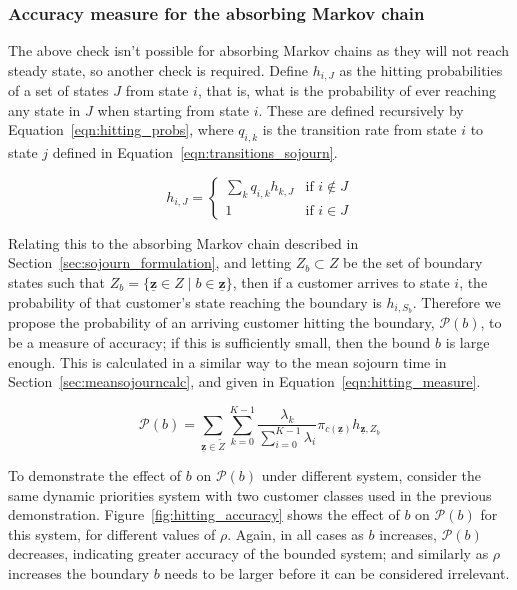 \documentclass{article}
\begin{document}
\subsubsection{Accuracy measure for the absorbing Markov chain}\label{sec:absorbing_accuracy}
The above check isn't possible for absorbing Markov chains as they will not
reach steady state, so another check is required. Define $h_{i,J}$ as
the hitting probabilities of a set of states $J$ from state $i$, that is, what
is the probability of ever reaching any state in $J$ when starting from state
$i$. These are defined recursively by Equation~\ref{eqn:hitting_probs}, where
$q_{i,k}$ is the transition rate from state $i$ to state $j$ defined in
Equation~\ref{eqn:transitions_sojourn}.

\begin{equation}\label{eqn:hitting_probs}
h_{i,J} = \begin{cases}
\sum_k q_{i,k} h_{k,J} & \text{if } i \notin J \\
1 & \text{if } i \in J
\end{cases}
\end{equation}

Relating this to the absorbing Markov chain described in
Section~\ref{sec:sojourn_formulation}, and letting $Z_b \subset Z$ be the set of
boundary states such that
$Z_b = \{\underline{\mathbf{z}} \in Z \; | \; b \in \underline{\mathbf{z}}\}$,
then if a customer arrives to state $i$, the probability of that customer's
state reaching the boundary is $h_{i,S_b}$. Therefore we propose the probability
of an arriving customer hitting the boundary, $\mathcal{P}(b)$, to be a measure
of accuracy; if this is sufficiently small, then the bound $b$ is large enough.
This is calculated in a similar way to the mean sojourn time in
Section~\ref{sec:meansojourncalc}, and given in Equation~\ref{eqn:hitting_measure}.

\begin{equation}\label{eqn:hitting_measure}
\mathcal{P}(b) = \sum_{\underline{\mathbf{z}} \in \tilde{Z}} \sum_{k=0}^{K-1} \frac{\lambda_k}{\sum_{i=0}^{K-1} \lambda_i} \pi_{c(\underline{\mathbf{z}})} h_{\underline{\mathbf{z}}, Z_b}
\end{equation}

To demonstrate the effect of $b$ on $\mathcal{P}(b)$ under different system,
consider the same dynamic priorities system with two customer classes used in
the previous demonstration. Figure~\ref{fig:hitting_accuracy} shows the effect
of $b$ on $\mathcal{P}(b)$ for this system, for different values of $\rho$.
Again, in all cases as $b$ increases, $\mathcal{P}(b)$ decreases, indicating
greater accuracy of the bounded system; and similarly as $\rho$ increases the
boundary $b$ needs to be larger before it can be considered irrelevant.
\end{document}
